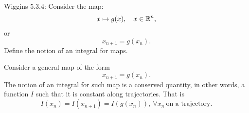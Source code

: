 \documentclass[12pt]{report}
\begin{document}
\newpage



\begin{problem}
    Wiggins 5.3.4:
    Consider the map:
    \[ 
        x \mapsto g(x), \quad x \in {\mathbb R}^n,
    \]
    or 
    \[ 
        x_{n+1} = g(x_n).
    \]
    Define the notion of an integral for maps. 
\end{problem}

\begin{solution}

    \noindent
    Consider a general map of the form
    \[ 
        x_{n+1} = g(x_n).
    \]
    The notion of an integral for such map is a conserved quantity, in other words, a function $I$ such that it is constant along trajectories. That is
    \[ 
        I(x_n) = I(x_{n+1}) = I(g(x_n)), ~ \forall x_n ~\text{on a trajectory}.
    \]
\end{solution}

\newpage


\end{document}
